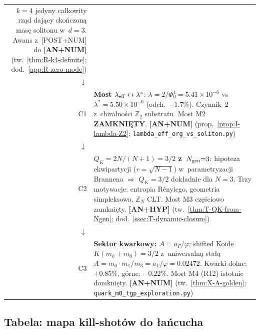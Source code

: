 \begin{center}
\begin{tabular}{@{}rl@{}}
       $k{=}4$ jedyny ca\l{}kowity rz\k{a}d daj\k{a}cy sko\'nczon\k{a}
       mas\k{e} solitonu w~$d{=}3$. Awans z~[POST+NUM] do \textbf{[AN+NUM]}
       (tw.~\ref{thm:R-k4-definite}; dod.~\ref{app:R-zero-mode}) \\
$\downarrow$ & \\
C1 & \textbf{Most $\lambda_{\rm eff} \leftrightarrow \lambda^*$}:
       $\lambda = 2/\Phi_0^4 = 5.41 \times 10^{-6}$ vs
       $\lambda^* = 5.50 \times 10^{-6}$ (odch.\ $-1.7\%$).
       Czynnik~2 z~chiralno\'sci $\mathbb{Z}_2$ substratu.
       Most M2 \textbf{ZAMKNI\k{E}TY}.
       \textbf{[AN+NUM]}
       (prop.~\ref{prop:I-lambda-Z2}; \texttt{lambda\_eff\_erg\_vs\_soliton.py}) \\
$\downarrow$ & \\
C2 & \textbf{$Q_K = 2N/(N{+}1) = 3/2$ z~$N_{\rm gen}{=}3$}:
       hipoteza ekwipartycji ($r = \sqrt{N{-}1}$) w~parametryzacji
       Brannena $\Rightarrow$ $Q_K = 3/2$ dok\l{}adnie dla $N{=}3$.
       Trzy motywacje: entropia R\'enyiego, geometria simpleksowa,
       $\mathbb{Z}_N$ CLT. Most M3 cz\k{e}\'sciowo zamkni\k{e}ty.
       \textbf{[AN+HYP]}
       (tw.~\ref{thm:T-QK-from-Ngen}; dod.~\ref{ssec:T-dynamic-closure}) \\
$\downarrow$ & \\
C3 & \textbf{Sektor kwarkowy: $A = a_\Gamma/\varphi$}:
       shifted Koide $K(m_k + m_0) = 3/2$ z~uniwersaln\k{a} sta\l{}\k{a}
       $A = m_0 \cdot m_1 / m_3 = a_\Gamma/\varphi = 0.02472$.
       Kwarki dolne: $+0.85\%$, g\'orne: $-0.22\%$.
       Most M4 (R12) istotnie domkni\k{e}ty.
       \textbf{[AN+NUM]}
       (tw.~\ref{thm:X-A-golden}; \texttt{quark\_m0\_tgp\_exploration.py}) \\
\bottomrule
\end{tabular}
\end{center}

\subsection{Tabela: mapa kill-shot\'ow do \l{}a\'ncucha}%
\label{app:H-killshot-map}

